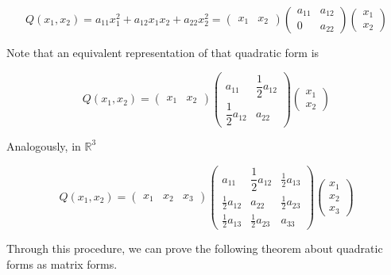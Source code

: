 \documentclass[a4paper,11pt]{article}
\theoremstyle{definition}
\theoremstyle{plain}
\begin{document}
\[
Q(x_1, x_2) = a_{11}x_1^2 + a_{12}x_1 x_2 + a_{22} x_2^2 = \begin{pmatrix} x_1 & x_2 \end{pmatrix} \begin{pmatrix} a_{11} & a_{12} \\ 0 & a_{22}\end{pmatrix} \begin{pmatrix} x_1 \\ x_2 \end{pmatrix}
\]

Note that an equivalent representation of that quadratic form is

\[
Q(x_1, x_2) = \begin{pmatrix} x_1 & x_2 \end{pmatrix} \begin{pmatrix} a_{11} & \dfrac{1}{2}a_{12} \\ \dfrac{1}{2}a_{12} & a_{22}\end{pmatrix} \begin{pmatrix} x_1 \\ x_2 \end{pmatrix}
\]

Analogously, in \(\mathbb{R}^3\)

\[
Q(x_1, x_2) = \begin{pmatrix} x_1 & x_2 & x_3\end{pmatrix} \begin{pmatrix} a_{11} & \dfrac{1}{2}a_{12} & \frac{1}{2} a_{13} \\ \frac{1}{2}a_{12} & a_{22} & \frac{1}{2}a_{23} \\ \frac{1}{2}a_{13} & \frac{1}{2} a_{23} & a_{33}\end{pmatrix} \begin{pmatrix} x_1 \\ x_2 \\ x_3 \end{pmatrix}
\]

Through this procedure, we can prove the following theorem about
quadratic forms as matrix forms.
\end{document}
